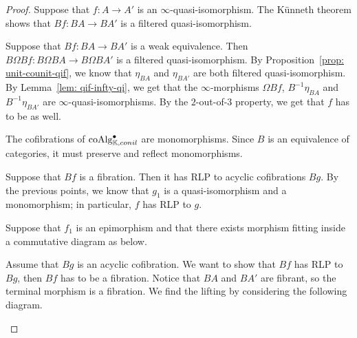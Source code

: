 \documentclass[../thesis.tex]{subfiles}
\begin{document}
        \begin{proof}
            Suppose that $f: A \rightarrow A'$ is an $\infty$-quasi-isomorphism. The K\"unneth theorem shows that $Bf: BA \rightarrow BA'$ is a filtered quasi-isomorphism.

            Suppose that $Bf: BA \rightarrow BA'$ is a weak equivalence. Then $B\Omega Bf: B\Omega BA \rightarrow B\Omega BA'$ is a filtered quasi-isomorphism. By Proposition~\ref{prop: unit-counit-qif}, we know that $\eta_{BA}$ and $\eta_{BA'}$ are both filtered quasi-isomorphism. By Lemma~\ref{lem: qif-infty-qi}, we get that the $\infty$-morphisms $\Omega Bf$, $B^{-1}\eta_{BA}$ and $B^{-1}\eta_{BA'}$ are $\infty$-quasi-isomorphisms. By the $2$-out-of-$3$ property, we get that $f$ has to be as well.

            The cofibrations of $\tt{coAlg}_{\mathbb{K},conil}^\bullet$ are monomorphisms. Since $B$ is an equivalence of categories, it must preserve and reflect monomorphisms.

            Suppose that $Bf$ is a fibration. Then it has RLP to acyclic cofibrations $Bg$. By the previous points, we know that $g_1$ is a quasi-isomorphism and a monomorphism; in particular, $f$ has RLP to $g$.

            Suppose that $f_1$ is an epimorphism and that there exists morphism fitting inside a commutative diagram as below.
            \begin{center}
            \end{center}
            Assume that $Bg$ is an acyclic cofibration. We want to show that $Bf$ has RLP to $Bg$, then $Bf$ has to be a fibration. Notice that $BA$ and $BA'$ are fibrant, so the terminal morphism is a fibration. We find the lifting by considering the following diagram.
            \begin{center}
            \end{center}

        \end{proof}
\end{document}
